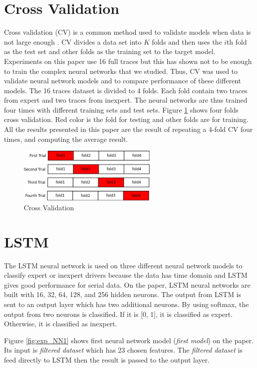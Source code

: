 \documentclass[draft,dvipsnames]{drexel-thesis}
\begin{document}
\begin{thesis}
\section{Cross Validation}
Cross validation (CV) is a common method used to validate models when data is not large enough \cite{Goodfellow-et-al-2016}. CV divides a data set into $K$ folds and then uses the $i$th fold as the test set and other folds as the training set to the target model. Experiments on this paper use 16 full traces but this has shown not to be enough to train the complex neural networks that we studied. Thus, CV was used to validate neural network models and to compare performance of these different models. The 16 traces dataset is divided to 4 folds. Each fold contain two traces from expert and two traces from inexpert. The neural networks are thus trained four times with different training sets and test sets. Figure \ref{fig:CV} shows four folds cross validation. Red color is the fold for testing and other folds are for training. All the results presented in this paper are the result of repeating a 4-fold CV four times, and computing the average result.

\begin{figure}[tb]
    \centering
    \includegraphics[width=0.6\textwidth]{pictures/figures/CV.png}
    \caption{Cross Validation}
    \label{fig:CV}
\end{figure}


\section{LSTM}
The LSTM neural network is used on three different neural network models to classify expert or inexpert drivers because the data has time domain and LSTM gives good performance for serial data. On the paper, LSTM neural networks are built with 16, 32, 64, 128, and 256 hidden neurons. The output from LSTM is sent to an output layer which has two additional neurons. By using softmax, the output from two neurons is classified. If it is [0, 1], it is classified as expert. Otherwise, it is classified as inexpert.

Figure \ref{fig:exp_NN1} shows first neural network model ({\em first model}) on the paper. Its input is {\em filtered dataset} which has 23 chosen features. The {\em filtered dataset} is feed directly to LSTM then the result is passed to the output layer.


\end{thesis}
\end{document}
